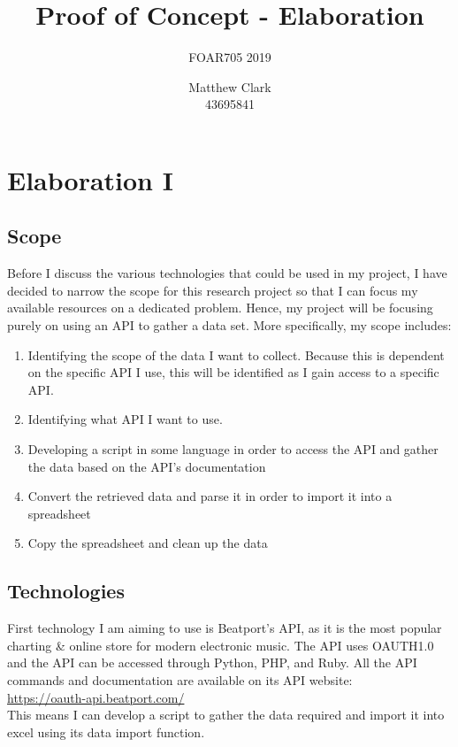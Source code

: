 \documentclass{article}
\title{Proof of Concept - Elaboration}
\subtitle{FOAR705 2019}
\author{Matthew Clark\\43695841}
\date{\vspace{-5ex}} %
\begin{document}
\doublespacing
\maketitle
\newpage
\tableofcontents
\newpage
\section{Elaboration I}
\subsection{Scope}
Before I discuss the various technologies that could be used in my project, I have decided to narrow the scope for this research project so that I can focus my available resources on a dedicated problem. Hence, my project will be focusing purely on using an API to gather a data set. More specifically, my scope includes:
\begin{enumerate}
    \item Identifying the scope of the data I want to collect. Because this is dependent on the specific API I use, this will be identified as I gain access to a specific API.
    \item Identifying what API I want to use.
    \item Developing a script in some language in order to access the API and gather the data based on the API's documentation
    \item Convert the retrieved data and parse it in order to import it into a spreadsheet
    \item Copy the spreadsheet and clean up the data
\end{enumerate}
\subsection{Technologies}
First technology I am aiming to use is Beatport's API, as it is the most popular charting \& online store for modern electronic music. The API uses OAUTH1.0 and the API can be accessed through Python, PHP, and Ruby. All the API commands and documentation are available on its API website:\\\url{https://oauth-api.beatport.com/}\\This means I can develop a script to gather the data required and import it into excel using its data import function.
\end{document}
